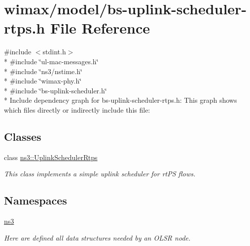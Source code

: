 \hypertarget{bs-uplink-scheduler-rtps_8h}{}\section{wimax/model/bs-\/uplink-\/scheduler-\/rtps.h File Reference}
\label{bs-uplink-scheduler-rtps_8h}
{\ttfamily \#include $<$stdint.\+h$>$}\\*
{\ttfamily \#include \char`\"{}ul-\/mac-\/messages.\+h\char`\"{}}\\*
{\ttfamily \#include \char`\"{}ns3/nstime.\+h\char`\"{}}\\*
{\ttfamily \#include \char`\"{}wimax-\/phy.\+h\char`\"{}}\\*
{\ttfamily \#include \char`\"{}bs-\/uplink-\/scheduler.\+h\char`\"{}}\\*
Include dependency graph for bs-\/uplink-\/scheduler-\/rtps.h\+:
This graph shows which files directly or indirectly include this file\+:
\subsection*{Classes}
\begin{DoxyCompactItemize}
\item 
class \hyperlink{classns3_1_1UplinkSchedulerRtps}{ns3\+::\+Uplink\+Scheduler\+Rtps}
\begin{DoxyCompactList}\small\item\em This class implements a simple uplink scheduler for rt\+PS flows. \end{DoxyCompactList}\end{DoxyCompactItemize}
\subsection*{Namespaces}
\begin{DoxyCompactItemize}
\item 
 \hyperlink{namespacens3}{ns3}
\begin{DoxyCompactList}\small\item\em Here are defined all data structures needed by an O\+L\+SR node. \end{DoxyCompactList}\end{DoxyCompactItemize}
